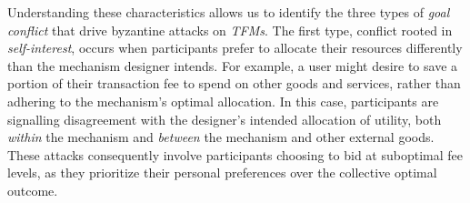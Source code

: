 \documentclass[sigconf,anonymous]{aamas}
\begin{document}
% 
% 

Understanding these characteristics allows us to identify the three types of \textit{goal conflict} that drive byzantine attacks on \textit{TFMs}. The first type, conflict rooted in \textit{self-interest}, occurs when participants prefer to allocate their resources differently than the mechanism designer intends. For example, a user might desire to save a portion of their transaction fee to spend on other goods and services, rather than adhering to the mechanism's optimal allocation. In this case, participants are signalling disagreement with the designer's intended allocation of utility, both \textit{within} the mechanism and \textit{between} the mechanism and other external goods. These attacks consequently involve participants choosing to bid at suboptimal fee levels, as they prioritize their personal preferences over the collective optimal outcome.
\end{document}
